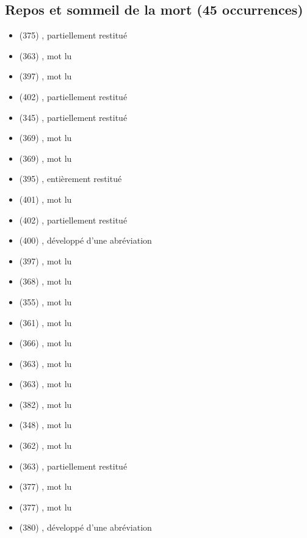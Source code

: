 \subsection*{Repos et sommeil de la mort (45 occurrences)}
\begin{itemize}[leftmargin=1.2em,itemsep=0pt]
\item {} (375) , partiellement restitué
\item {} (363) , mot lu
\item {} (397) , mot lu
\item {} (402) , partiellement restitué
\item {} (345) , partiellement restitué
\item {} (369) , mot lu
\item {} (369) , mot lu
\item {} (395) , entièrement restitué
\item {} (401) , mot lu
\item {} (402) , partiellement restitué
\item {} (400) , développé d’une abréviation
\item {} (397) , mot lu
\item {} (368) , mot lu
\item {} (355) , mot lu
\item {} (361) , mot lu
\item {} (366) , mot lu
\item {} (363) , mot lu
\item {} (363) , mot lu
\item {} (382) , mot lu
\item {} (348) , mot lu
\item {} (362) , mot lu
\item {} (363) , partiellement restitué
\item {} (377) , mot lu
\item {} (377) , mot lu
\item {} (380) , développé d’une abréviation

\end{itemize}
